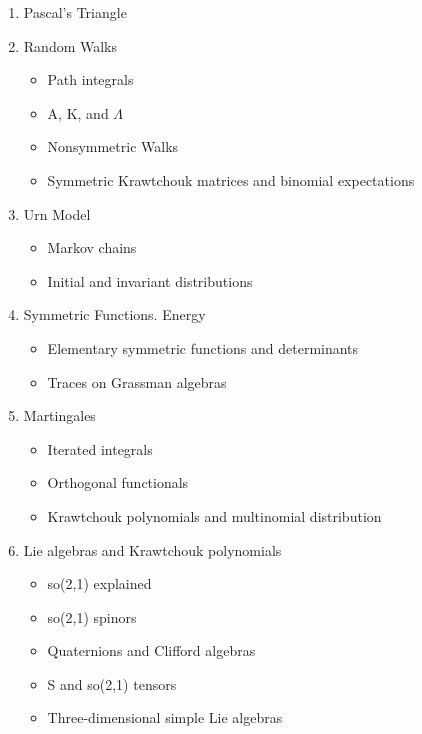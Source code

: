 \documentclass[12pt]{article}
\numberwithin{equation}{section}
\begin{document}
\begin{enumerate}

\item Pascal's Triangle

\item Random Walks  
\begin{itemize} 
\item  Path integrals
\item  A, K, and $\Lambda$
\item  Nonsymmetric Walks
\item  Symmetric Krawtchouk matrices and binomial expectations 
 \end{itemize}   


\item Urn Model  

\begin{itemize} 
\item   Markov chains 
\item  Initial and invariant distributions 
\end{itemize}


\item Symmetric Functions. Energy  

\begin{itemize} 
\item   Elementary symmetric functions and determinants 
\item  Traces on Grassman algebras 


 \end{itemize}

\item Martingales   

 
\begin{itemize} 
\item   Iterated integrals 
\item  Orthogonal functionals 
\item  Krawtchouk polynomials and multinomial distribution 
 \end{itemize}

\item Lie algebras and Krawtchouk polynomials  
 
 
\begin{itemize}
\item   so(2,1) explained 
\item  so(2,1) spinors 
\item  Quaternions and Clifford algebras 
\item  S and so(2,1) tensors 
\item Three-dimensional simple Lie algebras 
 \end{itemize}


\end{enumerate}
\end{document}
